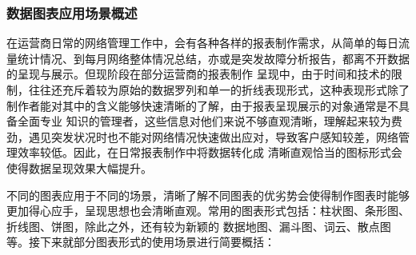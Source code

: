 \documentclass{HustGraduPaper}
\begin{document}
    \subsubsection{数据图表应用场景概述}
    在运营商日常的网络管理工作中，会有各种各样的报表制作需求，从简单的每日流量统计情况、到每月网络整体情况总结，亦或是突发故障分析报告，都离不开数据的呈现与展示。但现阶段在部分运营商的报表制作
    呈现中，由于时间和技术的限制，往往还充斥着较为原始的数据罗列和单一的折线表现形式，这种表现形式除了制作者能对其中的含义能够快速清晰的了解，由于报表呈现展示的对象通常是不具备全面专业
    知识的管理者，这些信息对他们来说不够直观清晰，理解起来较为费劲，遇见突发状况时也不能对网络情况快速做出应对，导致客户感知较差，网络管理效率较低。因此，在日常报表制作中将数据转化成
    清晰直观恰当的图标形式会使得数据呈现效果大幅提升。

    不同的图表应用于不同的场景，清晰了解不同图表的优劣势会使得制作图表时能够更加得心应手，呈现思想也会清晰直观。常用的图表形式包括：柱状图、条形图、折线图、饼图，除此之外，还有较为新颖的
    数据地图、漏斗图、词云、散点图等。接下来就部分图表形式的使用场景进行简要概括：
\end{document}
